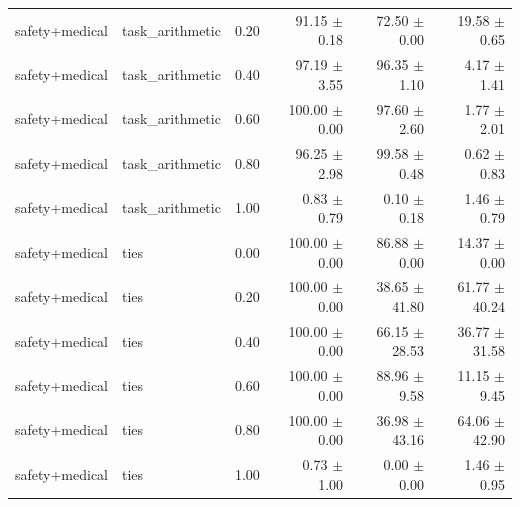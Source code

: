 \documentclass{article}
\begin{document}
\begin{table}[H]
{\begin{tabular}{lllrrr}
safety+medical & task\_arithmetic & 0.20 & 91.15 $\pm$ 0.18 & 72.50 $\pm$ 0.00 & 19.58 $\pm$ 0.65 \\
safety+medical & task\_arithmetic & 0.40 & 97.19 $\pm$ 3.55 & 96.35 $\pm$ 1.10 & 4.17 $\pm$ 1.41 \\
safety+medical & task\_arithmetic & 0.60 & 100.00 $\pm$ 0.00 & 97.60 $\pm$ 2.60 & 1.77 $\pm$ 2.01 \\
safety+medical & task\_arithmetic & 0.80 & 96.25 $\pm$ 2.98 & 99.58 $\pm$ 0.48 & 0.62 $\pm$ 0.83 \\
safety+medical & task\_arithmetic & 1.00 & 0.83 $\pm$ 0.79 & 0.10 $\pm$ 0.18 & 1.46 $\pm$ 0.79 \\
safety+medical & ties & 0.00 & 100.00 $\pm$ 0.00 & 86.88 $\pm$ 0.00 & 14.37 $\pm$ 0.00 \\
safety+medical & ties & 0.20 & 100.00 $\pm$ 0.00 & 38.65 $\pm$ 41.80 & 61.77 $\pm$ 40.24 \\
safety+medical & ties & 0.40 & 100.00 $\pm$ 0.00 & 66.15 $\pm$ 28.53 & 36.77 $\pm$ 31.58 \\
safety+medical & ties & 0.60 & 100.00 $\pm$ 0.00 & 88.96 $\pm$ 9.58 & 11.15 $\pm$ 9.45 \\
safety+medical & ties & 0.80 & 100.00 $\pm$ 0.00 & 36.98 $\pm$ 43.16 & 64.06 $\pm$ 42.90 \\
safety+medical & ties & 1.00 & 0.73 $\pm$ 1.00 & 0.00 $\pm$ 0.00 & 1.46 $\pm$ 0.95 \\
\bottomrule
\end{tabular}
}
\end{table}


\begin{table}[H]
\centering
\caption{予備実験 シード別詳細 - Method: mergealign, Pattern: safety+medical}
\label{tab:prelim_seeds_mergealign_safety_medical}
\small
{}
\end{table}
\end{document}

